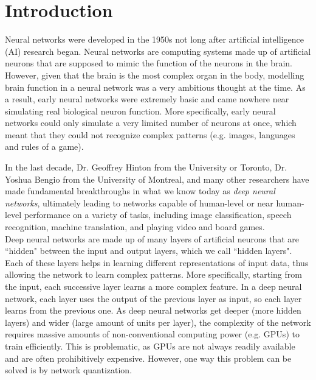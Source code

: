 \section{Introduction}
\label{S:1}

Neural networks were developed in the 1950s not long after artificial intelligence (AI) research began. Neural networks are computing systems made up of artificial neurons that are supposed to mimic the function of the neurons in the brain. However, given that the brain is the most complex organ in the body, modelling brain function in a neural network was a very ambitious thought at the time. As a result, early neural networks were extremely basic and came nowhere near simulating real biological neuron function. More specifically, early neural networks could only simulate a very limited number of neurons at once, which meant that they could not recognize complex patterns (e.g. images, languages and rules of a game). 
 
In the last decade, Dr. Geoffrey Hinton from the University or Toronto, Dr. Yoshua Bengio from the University of Montreal, and many other researchers have made fundamental breakthroughs\cite{hinton2012neural}\cite{bengio2013estimating}\cite{bengio2014auto}\cite{lee2015difference}\cite{hubara2016quantized} in what we know today as \textit{deep neural networks}, ultimately leading to networks capable of human-level or near human-level performance on a variety of tasks, including image classification, speech recognition, machine translation, and playing video and board games.\\

Deep neural networks are made up of many layers of artificial neurons that are ``hidden" between the input and output layers, which we call ``hidden layers". Each of these layers helps in learning different representations of input data, thus allowing the network to learn complex patterns. More specifically, starting from the input, each successive layer learns a more complex feature. In a deep neural network, each layer uses the output of the previous layer as input, so each layer learns from the previous one. As deep neural networks get deeper (more hidden layers) and wider (large amount of units per layer), the complexity of the network requires massive amounts of non-conventional computing power (e.g. GPUs) to train efficiently. This is problematic, as GPUs are not always readily available and are often prohibitively expensive. However, one way this problem can be solved is by network quantization. \\

